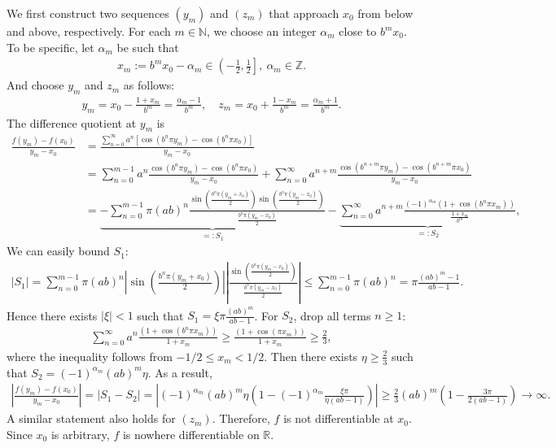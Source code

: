 \documentclass{article}
\begin{document}
We first construct two sequences $(y_m)$ and $(z_m)$ that approach $x_0$ from below and above, respectively. For each $m\in\mathbb{N}$, we choose an integer $\alpha_m$ close to $b^m x_0$. To be specific, let $\alpha_m$ be such that
\begin{align*}
	x_m:= b^m x_0 - \alpha_m \in \left(-\frac{1}{2},\frac{1}{2}\right],\ \alpha_m\in\mathbb{Z}.
\end{align*}
And choose $y_m$ and $z_m$ as follows:
\begin{align*}
	y_m = x_0 -\frac{1+x_m}{b^m} = \frac{\alpha_m-1}{b^m},\quad z_m = x_0 + \frac{1-x_m}{b^m} = \frac{\alpha_m+1}{b^m}.
\end{align*}
The difference quotient at $y_m$ is
\begin{align*}
	\frac{f(y_m) - f(x_0)}{y_m-x_0} &= \frac{\sum_{n=0}^\infty a^n\left[\cos(b^n\pi y_m) - \cos\left(b^n\pi x_0\right)\right]}{y_m-x_0}\\
	&= \sum_{n=0}^{m-1}a^n\frac{\cos(b^n\pi y_m) - \cos\left(b^n\pi x_0\right)}{y_m-x_0} + \sum_{n=0}^{\infty}a^{n+m}\frac{\cos(b^{n+m}\pi y_{m}) - \cos\left(b^{n+m}\pi x_0\right)}{y_{m}-x_0}\\
	&= \underbrace{-\sum_{n=0}^{m-1}\pi(ab)^n\frac{\sin\left(\frac{b^n\pi (y_m+x_0)}{2}\right)\sin\left(\frac{b^n\pi (y_m-x_0)}{2}\right)}{\frac{b^n\pi (y_m-x_0)}{2}}}_{=:S_1} - \underbrace{\sum_{n=0}^{\infty}a^{n+m}\frac{(-1)^{\alpha_m}\left(1 + \cos\left(b^{n}\pi x_m\right)\right)}{\frac{1+x_m}{b^m}}}_{=:S_2},
\end{align*}
We can easily bound $S_1$:
\begin{align*}
	\vert S_1\vert = \sum_{n=0}^{m-1}\pi(ab)^n\left\vert \sin\left(\frac{b^n\pi (y_m+x_0)}{2}\right)\right\vert\left\vert\frac{\sin\left(\frac{b^n\pi (y_m-x_0)}{2}\right)}{\frac{b^n\pi (y_m-x_0)}{2}}\right\vert \leq\sum_{n=0}^{m-1}\pi(ab)^n= \pi\frac{(ab)^m-1}{ab-1}.
\end{align*}
Hence there exists $\vert\xi\vert<1$ such that $S_1=\xi\pi\frac{(ab)^m}{ab-1}$. For $S_2$, drop all terms $n\geq 1$:
\begin{align*}
	\sum_{n=0}^{\infty}a^n\frac{\left(1 + \cos\left(b^{n}\pi x_m\right)\right)}{1+x_m}\geq\frac{\left(1 + \cos\left(\pi x_m\right)\right)}{1+x_m}\geq \frac{2}{3},
\end{align*}
where the inequality follows from $-1/2\leq x_m < 1/2$. Then there exists $\eta\geq\frac{2}{3}$ such that $S_2=(-1)^{\alpha_m}(ab)^m\eta$. As a result,
\begin{align*}
	\left\vert\frac{f(y_m) - f(x_0)}{y_m-x_0}\right\vert = \vert S_1 - S_2\vert
	= \left\vert(-1)^{\alpha_m}(ab)^m\eta\left(1-(-1)^{\alpha_m}\frac{\xi\pi}{\eta(ab-1)}\right)\right\vert \geq \frac{2}{3}(ab)^m\left(1-\frac{3\pi}{2(ab-1)}\right)\to\infty.
\end{align*}
A similar statement also holds for $(z_m)$. Therefore, $f$ is not differentiable at $x_0$. Since $x_0$ is arbitrary, $f$ is nowhere differentiable on $\mathbb{R}$.
\end{document}
